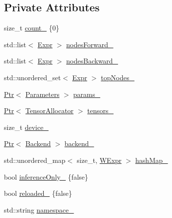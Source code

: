 \subsection*{Private Attributes}
\begin{DoxyCompactItemize}
\item 
size\+\_\+t \hyperlink{classmarian_1_1ExpressionGraph_af46afb7a2ba6ef751c927ccf98276b57}{count\+\_\+} \{0\}
\item 
std\+::list$<$ \hyperlink{namespacemarian_a498d8baf75b754011078b890b39c8e12}{Expr} $>$ \hyperlink{classmarian_1_1ExpressionGraph_a10819abcacf6b7ea924a895f90059473}{nodes\+Forward\+\_\+}
\item 
std\+::list$<$ \hyperlink{namespacemarian_a498d8baf75b754011078b890b39c8e12}{Expr} $>$ \hyperlink{classmarian_1_1ExpressionGraph_a8fa57dfedd51284cf51b1ba25401b646}{nodes\+Backward\+\_\+}
\item 
std\+::unordered\+\_\+set$<$ \hyperlink{namespacemarian_a498d8baf75b754011078b890b39c8e12}{Expr} $>$ \hyperlink{classmarian_1_1ExpressionGraph_a9dc6da42eac5ff91816adf1fa170c6e7}{top\+Nodes\+\_\+}
\item 
\hyperlink{namespacemarian_ad1a373be43a00ef9ce35666145137b08}{Ptr}$<$ \hyperlink{classmarian_1_1Parameters}{Parameters} $>$ \hyperlink{classmarian_1_1ExpressionGraph_a6abcd5dad584fa5abd9b55b75bb5ef87}{params\+\_\+}
\item 
\hyperlink{namespacemarian_ad1a373be43a00ef9ce35666145137b08}{Ptr}$<$ \hyperlink{classmarian_1_1TensorAllocator}{Tensor\+Allocator} $>$ \hyperlink{classmarian_1_1ExpressionGraph_a87f5a687e1d22e0db5e6304540c5e671}{tensors\+\_\+}
\item 
size\+\_\+t \hyperlink{classmarian_1_1ExpressionGraph_a25101cf64e67c3479ff3fff20a84b3a3}{device\+\_\+}
\item 
\hyperlink{namespacemarian_ad1a373be43a00ef9ce35666145137b08}{Ptr}$<$ \hyperlink{classmarian_1_1Backend}{Backend} $>$ \hyperlink{classmarian_1_1ExpressionGraph_a0f7e6ae1853ea83f5adc80fe3f5b2cb7}{backend\+\_\+}
\item 
std\+::unordered\+\_\+map$<$ size\+\_\+t, \hyperlink{namespacemarian_a2b926a792e343705a2eb5224771f47de}{W\+Expr} $>$ \hyperlink{classmarian_1_1ExpressionGraph_aca7c6d3f9253ab38d18d917b8cbd6fd4}{hash\+Map\+\_\+}
\item 
bool \hyperlink{classmarian_1_1ExpressionGraph_aa2c948ce5f377474df5f3a30db424541}{inference\+Only\+\_\+} \{false\}
\item 
bool \hyperlink{classmarian_1_1ExpressionGraph_aa10988c85ca38b3a1ffd72fa42278987}{reloaded\+\_\+} \{false\}
\item 
std\+::string \hyperlink{classmarian_1_1ExpressionGraph_a62c31bfad16a2939bced2f37b45dd8d7}{namespace\+\_\+}
\end{DoxyCompactItemize}


